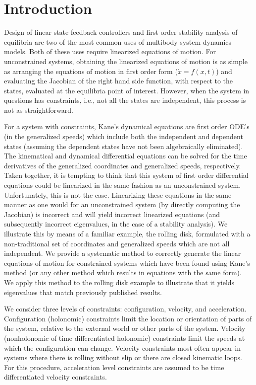 \documentclass[smallcondensed,final]{svjour3}                     %
\begin{document}
\section{Introduction}
\label{sec:intro}
Design of linear state feedback controllers and first order stability analysis
of equilibria are two of the most common uses of multibody system dynamics
models. Both of these uses require linearized equations of motion. For
unconstrained systems, obtaining the linearized equations of motion is as
simple as arranging the equations of motion in first order form ($\dot{x} =
f(x, t)$) and evaluating the Jacobian of the right hand side function, with
respect to the states, evaluated at the equilibria point of interest.  However,
when the system in questions has constraints, i.e., not all the states are
independent, this process is not as straightforward.

For a system with constraints, Kane's dynamical equations\cite{Kane1985} are
first order ODE's (in the generalized speeds) which include both the
independent and dependent states (assuming the dependent states have not been
algebraically eliminated). The kinematical and dynamical differential equations
can be solved for the time derivatives of the generalized coordinates and
generalized speeds, respectively. Taken together, it is tempting to think that
this system of first order differential equations could be linearized in the
same fashion as an unconstrained system.  Unfortunately, this is not the case.
Linearizing these equations in the same manner as one would for an
unconstrained system (by directly computing the Jacobian) is incorrect and will
yield incorrect linearized equations (and subsequently incorrect eigenvalues,
in the case of a stability analysis). We illustrate this by means of a familiar
example, the rolling disk, formulated with a non-traditional set of coordinates
and generalized speeds which are not all independent. We provide a systematic
method to correctly generate the linear equations of motion for constrained
systems which have been found using Kane's method (or any other method which
results in equations with the same form). We apply this method to the rolling
disk example to illustrate that it yields eigenvalues that match previously
published results.

We consider three levels of constraints: configuration, velocity, and
acceleration. Configuration (holonomic) constraints limit the location or
orientation of parts of the system, relative to the external world or other
parts of the system. Velocity (nonholonomic of time differentiated holonomic)
constraints limit the speeds at which the configuration can change.
Velocity constraints most often appear in systems where there is rolling
without slip or there are closed kinematic loops. For this procedure,
acceleration level constraints are assumed to be time differentiated velocity
constraints.
\end{document}
